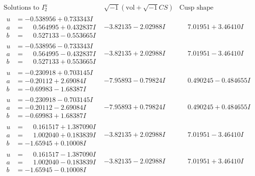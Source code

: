 \documentclass[1p]{elsarticle_modified}
\theoremstyle{definition}
\newcommand{\I}{\sqrt{-1}}
\begin{document}
$$\begin{array}{c|c|c}  
\text{Solutions to }I^u_{2}& \I (\text{vol} + \sqrt{-1}CS) & \text{Cusp shape}\\
 \hline 
\begin{aligned}
u &= -0.538956 + 0.733343 I \\
a &= \phantom{-}0.564995 + 0.432837 I \\
b &= \phantom{-}0.527133 - 0.553665 I\end{aligned}
 & -3.82135 - 2.02988 I & \phantom{-}7.01951 + 3.46410 I \\ \hline\begin{aligned}
u &= -0.538956 - 0.733343 I \\
a &= \phantom{-}0.564995 - 0.432837 I \\
b &= \phantom{-}0.527133 + 0.553665 I\end{aligned}
 & -3.82135 + 2.02988 I & \phantom{-}7.01951 - 3.46410 I \\ \hline\begin{aligned}
u &= -0.230918 + 0.703145 I \\
a &= -0.20112 + 2.69084 I \\
b &= -0.69983 - 1.68387 I\end{aligned}
 & -7.95893 - 0.79824 I & \phantom{-}0.490245 - 0.484655 I \\ \hline\begin{aligned}
u &= -0.230918 - 0.703145 I \\
a &= -0.20112 - 2.69084 I \\
b &= -0.69983 + 1.68387 I\end{aligned}
 & -7.95893 + 0.79824 I & \phantom{-}0.490245 + 0.484655 I \\ \hline\begin{aligned}
u &= \phantom{-}0.161517 + 1.387090 I \\
a &= \phantom{-}1.002040 + 0.183839 I \\
b &= -1.65945 + 0.10008 I\end{aligned}
 & -3.82135 + 2.02988 I & \phantom{-}7.01951 - 3.46410 I \\ \hline\begin{aligned}
u &= \phantom{-}0.161517 - 1.387090 I \\
a &= \phantom{-}1.002040 - 0.183839 I \\
b &= -1.65945 - 0.10008 I\end{aligned}
 & -3.82135 - 2.02988 I & \phantom{-}7.01951 + 3.46410 I \\ \hline\begin{aligned}

\end{aligned}
\end{array}$$
\end{document}
